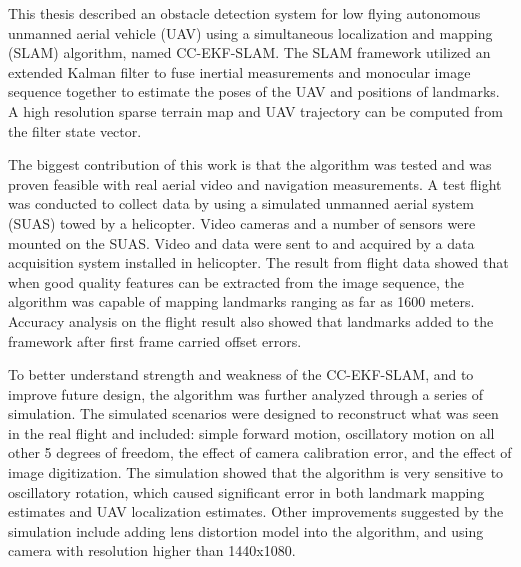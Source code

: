 This thesis described an obstacle detection system for low flying
autonomous unmanned aerial vehicle (UAV) using a simultaneous
localization and mapping (SLAM) algorithm, named CC-EKF-SLAM.
The SLAM framework utilized an extended Kalman filter to fuse inertial
measurements and monocular image sequence together to estimate the
poses of the UAV and positions of landmarks. A high resolution sparse
terrain map and UAV trajectory can be computed from the filter state
vector. 

The biggest contribution of this work is that the algorithm was tested
and was proven feasible with real aerial video and navigation
measurements. A test flight was conducted to collect data by using a
simulated unmanned aerial system (SUAS) towed by a helicopter. Video
cameras and a number of sensors were mounted on the SUAS. Video and
data were sent to and acquired by a data acquisition system installed
in helicopter. The result from flight data showed that when good
quality features can be extracted from the image sequence, the
algorithm was capable of mapping landmarks ranging as far as 1600
meters. Accuracy analysis on the flight result also showed that
landmarks added to the framework after first frame carried offset
errors.

To better understand strength and weakness of the CC-EKF-SLAM, and to
improve future design, the algorithm was further analyzed through a
series of simulation. The simulated scenarios were designed to
reconstruct what was seen in the real flight and included: simple
forward motion, oscillatory motion on all other 5 degrees of freedom,
the effect of camera calibration error, and the effect of image
digitization. The simulation showed that the algorithm is very
sensitive to oscillatory rotation, which caused significant error in
both landmark mapping estimates and UAV localization estimates. Other
improvements suggested by the simulation include adding lens
distortion model into the algorithm, and using camera with resolution
higher than 1440x1080.
